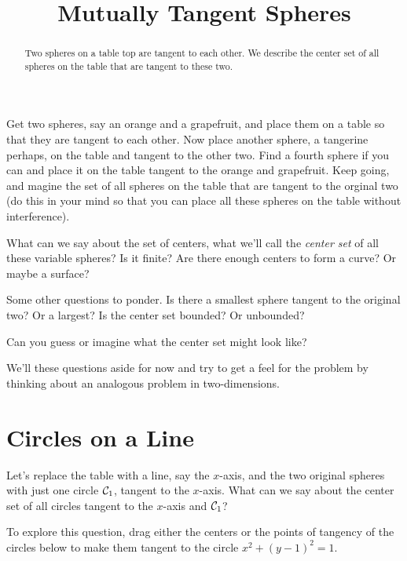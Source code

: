 \documentclass{ximera}
\title{Mutually Tangent Spheres}
\begin{document}
\begin{abstract}
Two spheres on a table top are tangent to each other. We describe the center set of all spheres on the table that are tangent to these two. 
\end{abstract}
\maketitle

Get two spheres, say an orange and a grapefruit, and place them on a table so that they are tangent to each other. Now place another sphere, a tangerine perhaps, on the table and tangent to the other two. Find a fourth sphere if you can and place it on the table tangent to the orange and grapefruit. Keep going, and magine the set of all spheres on the table that are tangent to the orginal two (do this in your mind so that you can place all these spheres on the table without interference). 

What can we say about the set of centers, what we'll call the \emph{center set} of all these variable spheres? Is it finite? Are there enough centers to form a curve? Or maybe a surface?

Some other questions to ponder. Is there a smallest sphere tangent to the original two? Or a largest? Is the center set bounded? Or unbounded?

Can you guess or imagine what the center set might look like?

We'll these questions aside for now and try to get a feel for the problem by thinking about an analogous problem in two-dimensions.

\section{Circles on a Line}
\begin{exploration}
Let's replace the table with a line, say the $x$-axis, and the two original spheres with just one circle ${\cal C}_1$, tangent to the $x$-axis. What can we say about the center set of all circles tangent to the $x$-axis and ${\cal C}_1$?

To explore this question, drag either the centers or the points of tangency of the circles below to make them tangent to the circle $x^2 + (y-1)^2=1$.

 
\begin{onlineOnly}
    \begin{center}
\end{center}
\end{onlineOnly}
\end{exploration}
\end{document}
